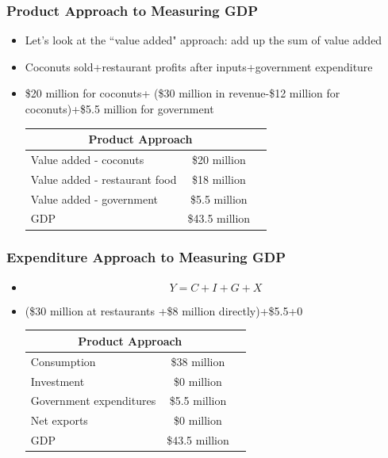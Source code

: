 \documentclass{beamer}
\begin{document}
\begin{frame}
\frametitle[alignment=center]{Product Approach to Measuring GDP}
\begin{itemize}
\item Let's look at the ``value added" approach:  add up the sum of value added
\item Coconuts sold+restaurant profits after inputs+government expenditure
\item \$20 million for coconuts+ (\$30 million in revenue-\$12 million for coconuts)+\$5.5 million for government
\begin{table}
\begin{tabular}{lcc}
\hline\hline
\multicolumn{2}{c}{Product Approach}\\
\hline
Value added - coconuts & \$20 million\\
Value added - restaurant food & \$18 million\\
Value added - government & \$5.5 million\\
\hline
GDP & \$43.5 million\\
\hline\hline
\end{tabular}
\end{table}
\end{itemize}
\end{frame}

\begin{frame}
\frametitle[alignment=center]{Expenditure Approach to Measuring GDP}
\begin{itemize}
\item $$Y=C+I+G+X$$
\item (\$30 million at restaurants +\$8 million directly)+\$5.5+0
\begin{table}
\begin{tabular}{lcc}
\hline\hline
\multicolumn{2}{c}{Product Approach}\\
\hline
Consumption & \$38 million\\
Investment & \$0 million\\
Government expenditures & \$5.5 million\\
Net exports & \$0 million\\
\hline
GDP & \$43.5 million\\
\hline\hline
\end{tabular}
\end{table}
\end{itemize}
\end{frame}
\end{document}
